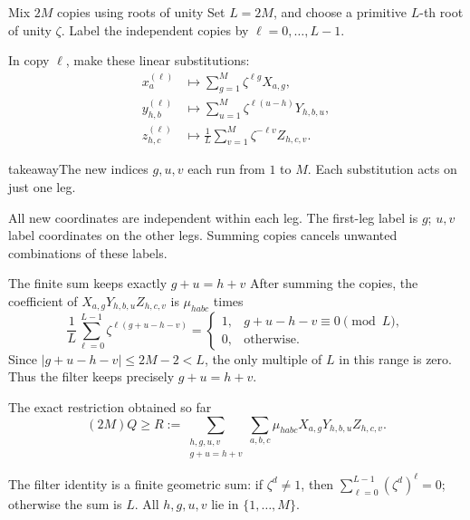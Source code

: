 \documentclass[aspectratio=169,11pt]{beamer}
\newcommand{\source}[1]{\vfill\par{\fontsize{7.5}{9}\selectfont\color{muted}#1\par}}
\newcommand{\takeaway}[1]{\begin{beamercolorbox}[sep=0.65em,wd=\linewidth]{takeaway}#1\end{beamercolorbox}}
\begin{document}
\begin{frame}{Mix $2M$ copies using roots of unity}
  Set $L=2M$, and choose a primitive $L$-th root of unity $\zeta$.
  Label the independent copies by $\ell=0,\ldots,L-1$.
  \par\medskip
  In copy $\ell$, make these linear substitutions:
  \[
  \begin{aligned}
    x_a^{(\ell)}
      &\longmapsto\sum_{g=1}^{M}\zeta^{\ell g}X_{a,g},\\
    y_{h,b}^{(\ell)}
      &\longmapsto\sum_{u=1}^{M}\zeta^{\ell(u-h)}Y_{h,b,u},\\
    z_{h,c}^{(\ell)}
      &\longmapsto\frac1L\sum_{v=1}^{M}\zeta^{-\ell v}Z_{h,c,v}.
  \end{aligned}
  \]
  \takeaway{The new indices $g,u,v$ each run from $1$ to $M$.
    Each substitution acts on just one leg.}
  \source{All new coordinates are independent within each leg.
  The first-leg label is $g$; $u,v$ label coordinates on the other legs.
  Summing copies cancels unwanted combinations of these labels.}
\end{frame}

\begin{frame}{The finite sum keeps exactly $g+u=h+v$}
  After summing the copies, the coefficient of
  $X_{a,g}Y_{h,b,u}Z_{h,c,v}$ is $\mu_{habc}$ times
  \[
    \frac1L\sum_{\ell=0}^{L-1}\zeta^{\ell(g+u-h-v)}
      =\begin{cases}
        1,&g+u-h-v\equiv0\pmod L,\\
        0,&\text{otherwise}.
      \end{cases}
  \]
  Since $|g+u-h-v|\le2M-2<L$, the only multiple of $L$ in this range is zero.
  Thus the filter keeps precisely $g+u=h+v$.
  \begin{block}{The exact restriction obtained so far}
    \[
      (2M)Q\ge R:=
      \sum_{\substack{h,g,u,v\\g+u=h+v}}\sum_{a,b,c}
      \mu_{habc}X_{a,g}Y_{h,b,u}Z_{h,c,v}.
    \]
  \end{block}
  \source{The filter identity is a finite geometric sum: if
  $\zeta^d\ne1$, then $\sum_{\ell=0}^{L-1}(\zeta^d)^\ell=0$;
  otherwise the sum is $L$. All $h,g,u,v$ lie in $\{1,\ldots,M\}$.}
\end{frame}
\end{document}
